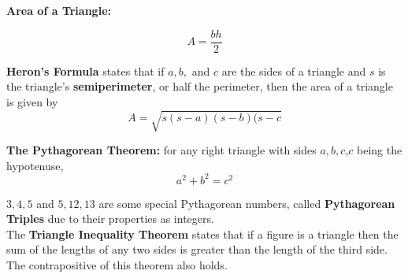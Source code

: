         \noindent \color{purple} \textbf{Area of a Triangle:} \color{black}

        \begin{equation*}
            A=\frac{bh}{2}
        \end{equation*}

        \begin{center}
        \end{center}

        \noindent \color{purple} \textbf{Heron's Formula} \color{black} states that if $a,b,$ and
        $c$ are the sides of a triangle and $s$ is the triangle's \textbf{semiperimeter}, or half
        the perimeter, then the area of a triangle is given by \\

        \begin{equation*}
            A = \sqrt{s(s-a)(s-b)(s-c}
        \end{equation*}

        \noindent \color{purple} \textbf{The Pythagorean Theorem:} \color{black} for any right
        triangle with sides $a,b,c$,$c$ being the hypotenuse, \\

        \begin{equation*}
            a^2 + b^2 = c^2
        \end{equation*}

        \noindent $3,4,5$ and $5,12,13$ are some special Pythagorean numbers, called
        \textbf{Pythagorean Triples} due to their properties as integers. \\

        \noindent The \color{purple} \textbf{Triangle Inequality Theorem} \color{black} states
        that if a figure is a triangle then the sum of the lengths of any two sides is greater
        than the length of the third side. The contrapositive of this theorem also holds.

